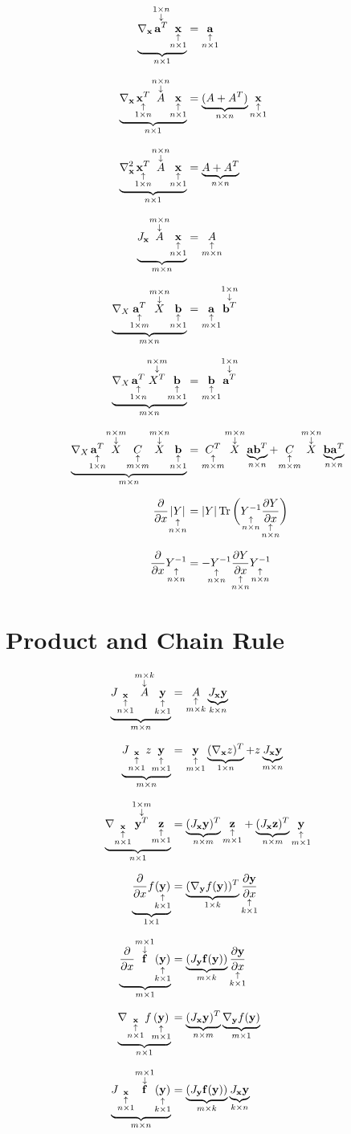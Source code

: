 \documentclass[12pt]{article}
\begin{document}
\begin{align}
    \undbr{\nabla_{\bd x}\annotop{\bd a^T}{1\times n}\annot{\bd x}{n\times1}}{n\times1}
    &= \annot{\bd a}{n\times1}
    \bbr
    \undbr{\nabla_{\bd x}\annot{\bd x^T}{1\times n}\annotop{A}{n\times n}\annot{\bd x}{n\times1}}{n\times1}
    &= \undbr{(A+A^T)}{n\times n}\annot{\bd x}{n\times1}
    \bbr
    \undbr{\nabla^2_{\bd x}\annot{\bd x^T}{1\times n}\annotop{A}{n\times n}\annot{\bd x}{n\times1}}{n\times1}
    &= \undbr{A+A^T}{n\times n}
    \bbr
    \undbr{J_{\bd x}\annotop{A}{m\times n}\annot{\bd x}{n\times1}}{m\times n}
    &= \annot{A}{m\times n}
    \bbr
    \undbr{\nabla_{X}\annot{\bd a^T}{1\times m}\annotop{X}{m\times n}\annot{\bd b}{n\times1}}{m\times n}
    &= \annot{\bd a}{m\times 1}\annotop{\bd b^T}{1\times n}
    \bbr
    \undbr{\nabla_{X}\annot{\bd a^T}{1\times n}\annotop{X^T}{n\times m}\annot{\bd b}{m\times1}}{m\times n}
    &= \annot{\bd b}{m\times 1}\annotop{\bd a^T}{1\times n}
    \bbr
    \undbr{\nabla_{X}\annot{\bd a^T}{1\times n}\annotop{X}{n\times m}\annot{C}{m\times m}\annotop{X}{m\times n}\annot{\bd b}{n\times1}}{m\times n}
    &= \annot{C^T}{m\times m}\annotop{X}{m\times n}\undbr{\bd a\bd b^T}{n\times n}
    + \annot{C}{m\times m}\annotop{X}{m\times n}\undbr{\bd b\bd a^T}{n\times n}
    \bbr
    \ppx x\annot{|Y|}{n\times n}
    &=|Y|\Tr\bigg(\annot{Y\iv}{n\times n}\annot{\pypx Yx}{n\times n}\bigg)
    \bbr
    \ppx x\annot{Y\iv}{n\times n}
    &=\annot{-Y\iv}{n\times n}\annot{\pypx Yx}{n\times n}\annot{Y\iv}{n\times n}
\end{align}

\section{Product and Chain Rule}

\begin{align}
    \undbr{J_{\annot{\bd x}{n\times1}}\annotop{A}{m\times k}\annot{\bd y}{k\times1}}{m\times n}
    &= \annot{A}{m\times k}\undbr{J_{\bd x}\bd y}{k\times n}
    \bbr
    \undbr{J_{\annot{\bd x}{n\times1}}z\annot{\bd y}{m\times1}}{m\times n}
    &= \annot{\bd y}{m\times1}\undbr{(\nabla_{\bd x}z)^T}{1\times n}
    + z\undbr{J_{\bd x}\bd y}{m\times n}
    \bbr
    \undbr{\nabla_{\annot{\bd x}{n\times1}}\annotop{\bd y^T}{1\times m}\annot{\bd z}{m\times1}}{n\times1}
    &= \undbr{(J_{\bd x}\bd y)^T}{n\times m}\annot{\bd z}{m\times1}
    + \undbr{(J_{\bd x}\bd z)^T}{n\times m}\annot{\bd y}{m\times1}
    \bbr
    \undbr{\ppx xf\annot{(\bd y)}{k\times1}}{1\times1}
    &= \undbr{(\nabla_{\bd y}f(\bd y))^T}{1\times k}\annot{\pypx{\bd y}x}{k\times1}
    \bbr
    \undbr{\ppx x\annotop{\bd f}{m\times1}\annot{(\bd y)}{k\times1}}{m\times1}
    &= \undbr{(J_{\bd y}\bd f(\bd y))}{m\times k}\annot{\pypx{\bd y}x}{k\times1}
    \bbr
    \undbr{\nabla_{\annot{\bd x}{n\times1}}f\annot{(\bd y)}{m\times1}}{n\times1}
    &= \undbr{(J_{\bd x}\bd y)^T}{n\times m}\undbr{\nabla_{\bd y}f(\bd y)}{m\times1}
    \bbr
    \undbr{J_{\annot{\bd x}{n\times1}}\annotop{\bd f}{m\times1}\annot{(\bd y)}{k\times1}}{m\times n}
    &= \undbr{(J_{\bd y}\bd f(\bd y))}{m\times k}\undbr{J_{\bd x}\bd y}{k\times n}
\end{align}
\end{document}
